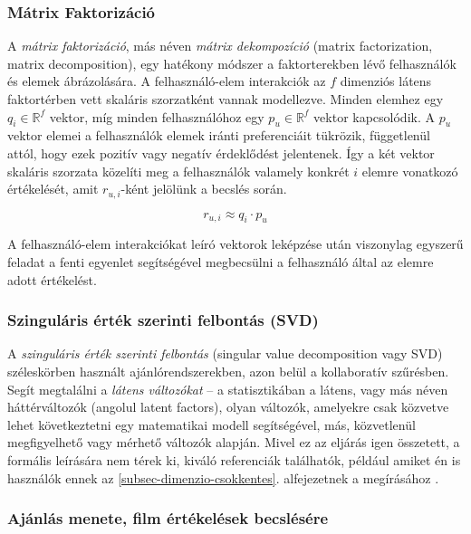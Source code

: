 \documentclass[
]{thesis-ekf}
\theoremstyle{definition}
\theoremstyle{remark}
\begin{document}
\subsubsection{Mátrix Faktorizáció}
A \emph{mátrix faktorizáció}, más néven \emph{mátrix dekompozíció} (matrix factorization, matrix decomposition), egy hatékony módszer a faktorterekben lévő felhasználók és elemek ábrázolására. A felhasználó-elem interakciók az $f$ dimenziós látens faktortérben vett skaláris szorzatként vannak modellezve. Minden elemhez egy $q_{i} \in \mathbb{R}^{f}$ vektor, míg minden felhasználóhoz egy $p_{u} \in \mathbb{R}^{f}$ vektor kapcsolódik. A $p_{u}$ vektor elemei a felhasználók elemek iránti preferenciáit tükrözik, függetlenül attól, hogy ezek pozitív vagy negatív érdeklődést jelentenek. Így a két vektor skaláris szorzata közelíti meg a felhasználók valamely konkrét $i$ elemre vonatkozó értékelését, amit $r_{u,i}$-ként jelölünk a becslés során.\cite{journal-netflix-prize-and-svd, matrix-factorization-techniques-for-rec-sys}

\[ r_{u,i} \approx q_{i}\cdot p_{u} \]\cite{journal-netflix-prize-and-svd}

A felhasználó-elem interakciókat leíró vektorok leképzése után viszonylag egyszerű feladat a fenti egyenlet segítségével megbecsülni a felhasználó által az elemre adott értékelést.\cite{journal-netflix-prize-and-svd}

\subsubsection{Szinguláris érték szerinti felbontás (SVD)}
\label{subsec-svd}
A \emph{szinguláris érték szerinti felbontás} (singular value decomposition vagy SVD) széleskörben használt ajánlórendszerekben, azon belül a kollaboratív szűrésben. Segít megtalálni a \emph{látens változókat} -- a statisztikában a látens, vagy más néven háttérváltozók (angolul latent factors), olyan változók, amelyekre csak közvetve lehet következtetni egy matematikai modell segítségével, más, közvetlenül megfigyelhető vagy mérhető változók alapján.\cite{wiki-latent-and-observable-variables}
Mivel ez az eljárás igen összetett, a formális leírására nem térek ki, kiváló referenciák találhatók, például amiket én is használók ennek az \ref{subsec-dimenzio-csokkentes}. alfejezetnek a megírásához \cite{journal-netflix-prize-and-svd, matrix-factorization-techniques-for-rec-sys, szingularis-ertek-felbontas-es-fuggvenyillesztes}.


\subsubsection{Ajánlás menete, film értékelések becslésére}
\end{document}
